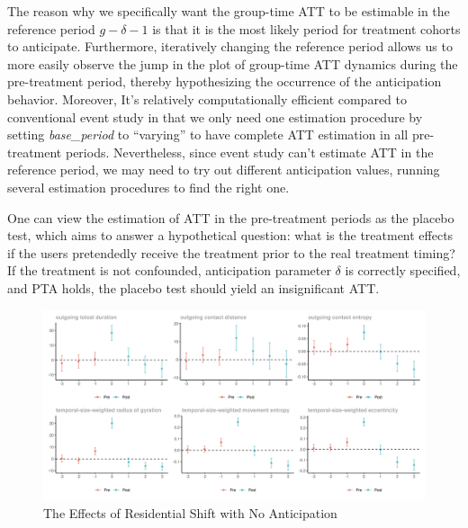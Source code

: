 The reason why we specifically want the group-time ATT to be estimable in the reference period \( g-\delta-1 \)	 is that it is the most likely period for treatment cohorts to anticipate.
Furthermore, iteratively changing the reference period allows us to more easily observe the jump in the plot of group-time ATT dynamics during the pre-treatment period, thereby hypothesizing the occurrence of the anticipation behavior.
Moreover, It's relatively computationally efficient compared to conventional event study in that we only need one estimation procedure by setting \textit{base\_period} to ``varying'' to have complete ATT estimation in all pre-treatment periods.
Nevertheless, since event study can't estimate ATT in the reference period, we may need to try out different anticipation values, running several estimation procedures to find the right one.

One can view the estimation of ATT in the pre-treatment periods as the placebo test, which aims to answer a hypothetical question: what is the treatment effects if the users pretendedly receive the treatment prior to the real treatment timing?
If the treatment is not confounded, anticipation parameter $\delta$ is correctly specified, and PTA holds, the placebo test should yield an insignificant ATT.

\begin{figure}[h!]
\centering
\caption{The Effects of Residential Shift with No Anticipation}
\vspace{0.1cm}

\includegraphics[width=1\textwidth]{figures/csdid/inspect_delta/residential_shift.png}

\label{fig:select_delta_residential_shift}
\end{figure}

